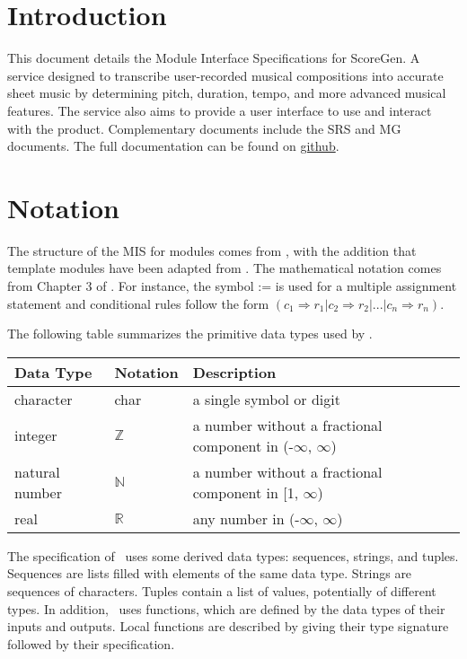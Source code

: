 \documentclass[12pt, titlepage]{article}
\begin{document}
\section{Introduction}
This document details the Module Interface Specifications for ScoreGen. A service designed to transcribe user-recorded musical compositions into accurate sheet music by determining pitch, duration, tempo, and more advanced musical features. The service also aims to provide a user interface to use and interact with the product. Complementary documents include the SRS and MG documents. The full documentation can be found on \href{https://github.com/emilyperica/ScoreGen}{github}.


\section{Notation}


The structure of the MIS for modules comes from \citet{HoffmanAndStrooper1995},
with the addition that template modules have been adapted from
\cite{GhezziEtAl2003}.  The mathematical notation comes from Chapter 3 of
\citet{HoffmanAndStrooper1995}.  For instance, the symbol := is used for a
multiple assignment statement and conditional rules follow the form $(c_1
\Rightarrow r_1 | c_2 \Rightarrow r_2 | ... | c_n \Rightarrow r_n )$.

The following table summarizes the primitive data types used by \progname. 

\begin{center}
\renewcommand{\arraystretch}{1.2}
\noindent 
\begin{tabular}{l l p{7.5cm}} 
\toprule 
\textbf{Data Type} & \textbf{Notation} & \textbf{Description}\\ 
\midrule
character & char & a single symbol or digit\\
integer & $\mathbb{Z}$ & a number without a fractional component in (-$\infty$, $\infty$) \\
natural number & $\mathbb{N}$ & a number without a fractional component in [1, $\infty$) \\
real & $\mathbb{R}$ & any number in (-$\infty$, $\infty$)\\
\bottomrule
\end{tabular} 
\end{center}

\noindent
The specification of \progname \ uses some derived data types: sequences, strings, and
tuples. Sequences are lists filled with elements of the same data type. Strings
are sequences of characters. Tuples contain a list of values, potentially of
different types. In addition, \progname \ uses functions, which
are defined by the data types of their inputs and outputs. Local functions are
described by giving their type signature followed by their specification.
\end{document}
